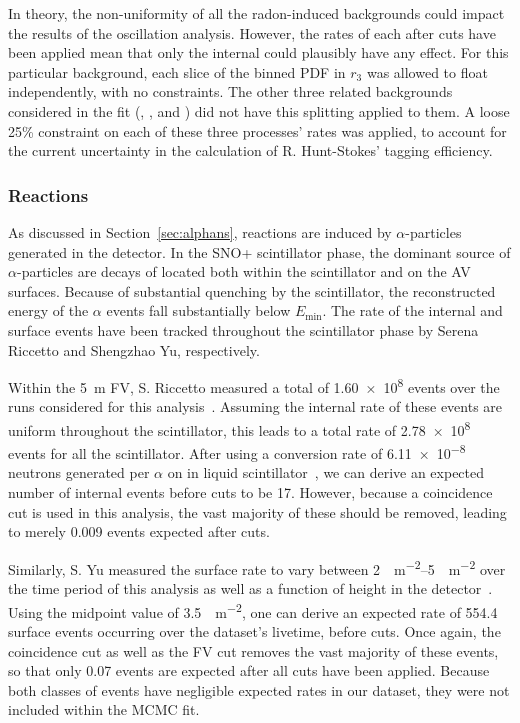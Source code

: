 In theory, the non-uniformity of all the radon-induced backgrounds could impact the results of the oscillation analysis. However, the rates of each after cuts have been applied mean that only the internal  could plausibly have any effect. For this particular background, each slice of the binned PDF in $r_{3}$ was allowed to float independently, with no constraints. The other three related backgrounds considered in the fit (, , and ) did not have this splitting applied to them. A loose 25\% constraint on each of these three processes' rates was applied, to account for the current uncertainty in the calculation of R. Hunt-Stokes' tagging efficiency.

\subsubsection{\alphan{} Reactions}
As discussed in Section~\ref{sec:alphans}, \alphan{} reactions are induced by $\alpha$-particles generated in the detector. In the SNO+ scintillator phase, the dominant source of $\alpha$-particles are decays of  located both within the scintillator and on the AV surfaces. Because of substantial quenching by the scintillator, the reconstructed energy of the  $\alpha$ events fall substantially below $E_{\textrm{min}}$. The rate of the internal and surface  events have been tracked throughout the scintillator phase by Serena Riccetto and Shengzhao Yu, respectively.

Within the \SI{5}{\m} FV, S. Riccetto measured a total of \num{1.60e8}  events over the runs considered for this analysis~\cite{}. %
Assuming the internal rate of these events are uniform throughout the scintillator, this leads to a total rate of \num{2.78e8} events for all the scintillator. After using a conversion rate of \num{6.11e-8} neutrons generated per $\alpha$ on  in liquid scintillator~\cite{}, %
we can derive an expected number of internal \alphan{} events before cuts to be 17. However, because a coincidence cut is used in this analysis, the vast majority of these should be removed, leading to merely 0.009 events expected after cuts.

Similarly, S. Yu measured the surface  rate to vary between \SIrange{2}{5}{\Bq\per\square\metre} over the time period of this analysis as well as a function of height in the detector~\cite{}. %
Using the midpoint value of \SI{3.5}{\Bq\per\square\metre}, one can derive an expected rate of 554.4 surface \alphan{} events occurring over the dataset's livetime, before cuts. Once again, the coincidence cut as well as the FV cut removes the vast majority of these events, so that only 0.07 events are expected after all cuts have been applied. Because both classes of \alphan{} events have negligible expected rates in our dataset, they were not included within the MCMC fit.

